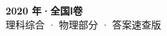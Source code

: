 \documentclass[zihao=-4, a4paper]{ctexart}
\begin{document}
\begin{center}
  {\Large\bfseries 2020 年·全国Ⅰ卷}\\[4pt]
  {\large 理科综合 · 物理部分 · 答案速查版}
\end{center}
\medskip
{}

\clearpage
{}

\end{document}

